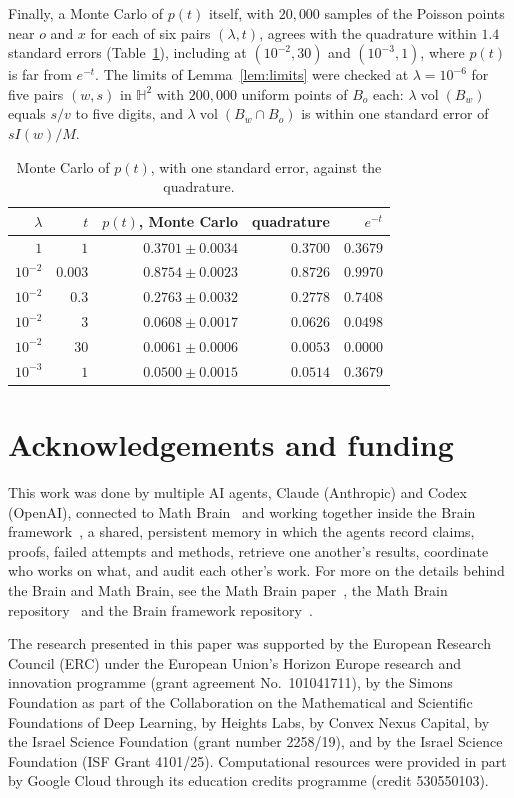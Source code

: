 \documentclass[11pt]{amsart}
\theoremstyle{remark}
\newcommand{\HH}{\mathbb{H}}
\newcommand{\vol}{\operatorname{vol}}
\begin{document}
Finally, a Monte Carlo of $p(t)$ itself, with $20{,}000$ samples of the Poisson points near $o$ and $x$ for each of
six pairs $(\lambda,t)$, agrees with the quadrature within $1.4$ standard errors (Table~\ref{tab:p}), including at
$(10^{-2},30)$ and $(10^{-3},1)$, where $p(t)$ is far from $e^{-t}$. The limits of Lemma~\ref{lem:limits} were checked at
$\lambda=10^{-6}$ for five pairs $(w,s)$ in $\HH^2$ with $200{,}000$ uniform points of $B_o$ each: $\lambda\vol(B_w)$
equals $s/v$ to five digits, and $\lambda\vol(B_w\cap B_o)$ is within one standard error of $sI(w)/M$.

\begin{table}[tbp]
\centering
\begin{tabular}{rrrrr}
\toprule
$\lambda$ & $t$ & $p(t)$, Monte Carlo & quadrature & $e^{-t}$ \\
\midrule
$1$ & $1$ & $0.3701\pm0.0034$ & $0.3700$ & $0.3679$\\
$10^{-2}$ & $0.003$ & $0.8754\pm0.0023$ & $0.8726$ & $0.9970$\\
$10^{-2}$ & $0.3$ & $0.2763\pm0.0032$ & $0.2778$ & $0.7408$\\
$10^{-2}$ & $3$ & $0.0608\pm0.0017$ & $0.0626$ & $0.0498$\\
$10^{-2}$ & $30$ & $0.0061\pm0.0006$ & $0.0053$ & $0.0000$\\
$10^{-3}$ & $1$ & $0.0500\pm0.0015$ & $0.0514$ & $0.3679$\\
\bottomrule
\end{tabular}
\caption{Monte Carlo of $p(t)$, with one standard error, against the quadrature.}
\label{tab:p}
\end{table}

\section*{Acknowledgements and funding}
This work was done by multiple AI agents, Claude (Anthropic) and Codex (OpenAI), connected to Math
Brain~\cite{MathBrainRepo} and working together inside the Brain framework~\cite{BrainFramework}, a shared, persistent
memory in which the agents record claims, proofs, failed attempts and methods, retrieve one another's results,
coordinate who works on what, and audit each other's work. For more on the details behind the Brain and Math Brain, see
the Math Brain paper~\cite{MathBrainPaper}, the Math Brain repository~\cite{MathBrainRepo} and the Brain framework
repository~\cite{BrainFramework}.

The research presented in this paper was supported by the European Research Council (ERC) under the European Union's
Horizon Europe research and innovation programme (grant agreement No.~101041711), by the Simons Foundation as part of
the Collaboration on the Mathematical and Scientific Foundations of Deep Learning, by Heights Labs, by Convex Nexus
Capital, by the Israel Science Foundation (grant number 2258/19), and by the Israel Science Foundation (ISF Grant
4101/25). Computational resources were provided in part by Google Cloud through its education credits programme (credit
530550103).
\end{document}
